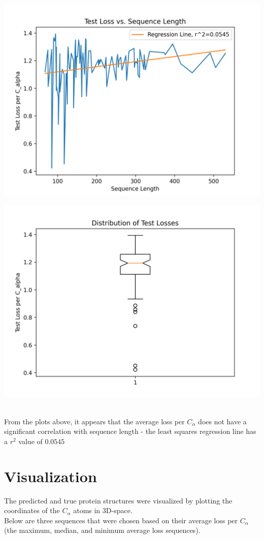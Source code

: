 \documentclass[11pt]{article}
\begin{document}
\begin{minipage}{0.45\textwidth}
\includegraphics[scale=0.5]{loss_seqs.png}
\end{minipage}
\hfill
\begin{minipage}{0.45\textwidth}
\includegraphics[scale=0.5]{loss_boxplot.png}
\end{minipage}\\[2mm]
From the plots above, it appears that the average loss per $C_{\alpha}$ does not have a significant correlation with sequence length - the least squares regression line has a $r^{2}$ value of $0.0545$

\section{Visualization}
The predicted and true protein structures were visualized by plotting the coordinates of the $C_{\alpha}$ atoms in 3D-space.\\[2mm]
Below are three sequences that were chosen based on their average loss per $C_{\alpha}$ (the maximum, median, and minimum average loss sequences).
\end{document}
